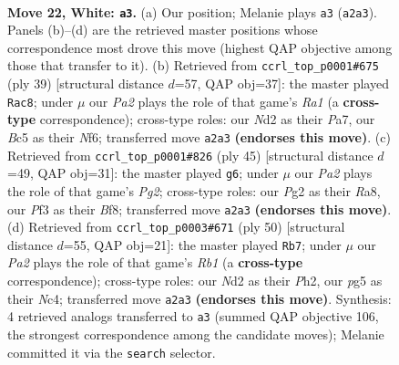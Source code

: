 \documentclass[11pt]{article}
\begin{document}
\clearpage

\begin{figure}[p]\centering
\begin{subfigure}{0.46\textwidth}\centering
\resizebox{\linewidth}{!}{%
\newchessgame
\chessboard[
  setfen={rn4kr/6b1/8/2Bp2p1/p2P3p/5P2/P2N2PP/R4RK1 w - - 0 22},
  showmover=false,
  pgfstyle=straightmove, color=movearrow, markmove={a2-a3}
]}
\caption{}
\end{subfigure}\hfill
\begin{subfigure}{0.46\textwidth}\centering
\resizebox{\linewidth}{!}{%
\newchessgame
\chessboard[
  setfen={r4rk1/p4ppp/2p2n2/2N2b2/2pP4/6P1/PP1R2BP/R5K1 b - - 0 20},
  showmover=false,
  pgfstyle=straightmove, color=movearrow, markmove={a8-c8}
]}
\caption{}
\end{subfigure}
\\[4pt]
\begin{subfigure}{0.46\textwidth}\centering
\resizebox{\linewidth}{!}{%
\newchessgame
\chessboard[
  setfen={r4bk1/p4pp1/1n6/7p/r1pN4/7P/PP1B1PP1/R1R3K1 b - - 1 23},
  showmover=false,
  pgfstyle=straightmove, color=movearrow, markmove={g7-g6}
]}
\caption{}
\end{subfigure}\hfill
\begin{subfigure}{0.46\textwidth}\centering
\resizebox{\linewidth}{!}{%
\newchessgame
\chessboard[
  setfen={2r3k1/4ppb1/2r2np1/p1P4p/2N5/B5P1/5P1P/1R3RK1 w - - 0 26},
  showmover=false,
  pgfstyle=straightmove, color=movearrow, markmove={b1-b7}
]}
\caption{}
\end{subfigure}
\caption{\textbf{Move 22, White: \texttt{a3}.} (a) Our position; Melanie plays \texttt{a3} (\texttt{a2a3}). Panels (b)--(d) are the retrieved master positions whose correspondence most drove this move (highest QAP objective among those that transfer to it). (b) Retrieved from \texttt{ccrl\_top\_p0001\#675} (ply 39) [structural distance $d$=57, QAP obj=37]: the master played \texttt{Rac8}; under $\mu$ our \emph{Pa2} plays the role of that game's \emph{Ra1} (a \textbf{cross-type} correspondence); cross-type roles: our \emph{N}d2 as their \emph{P}a7, our \emph{B}c5 as their \emph{N}f6; transferred move \texttt{a2a3} \textbf{(endorses this move)}. (c) Retrieved from \texttt{ccrl\_top\_p0001\#826} (ply 45) [structural distance $d$=49, QAP obj=31]: the master played \texttt{g6}; under $\mu$ our \emph{Pa2} plays the role of that game's \emph{Pg2}; cross-type roles: our \emph{P}g2 as their \emph{R}a8, our \emph{P}f3 as their \emph{B}f8; transferred move \texttt{a2a3} \textbf{(endorses this move)}. (d) Retrieved from \texttt{ccrl\_top\_p0003\#671} (ply 50) [structural distance $d$=55, QAP obj=21]: the master played \texttt{Rb7}; under $\mu$ our \emph{Pa2} plays the role of that game's \emph{Rb1} (a \textbf{cross-type} correspondence); cross-type roles: our \emph{N}d2 as their \emph{P}h2, our \emph{p}g5 as their \emph{N}c4; transferred move \texttt{a2a3} \textbf{(endorses this move)}. Synthesis: 4 retrieved analogs transferred to \texttt{a3} (summed QAP objective 106, the strongest correspondence among the candidate moves); Melanie committed it via the \texttt{search} selector.}
\label{fig:thought-m42}
\end{figure}
\end{document}
